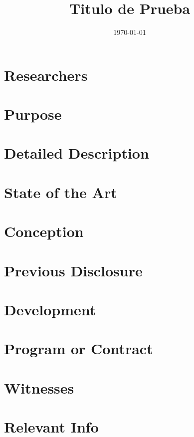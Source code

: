 \documentclass{article}
\title{
Titulo de Prueba
}
\date{\today}
\begin{document}
\maketitle

\section*{Researchers}

\section*{Purpose}

\section*{Detailed Description}

\section*{State of the Art}

\section*{Conception}

\section*{Previous Disclosure}

\section*{Development}

\section*{Program or Contract}

\section*{Witnesses}

\section*{Relevant Info}
\end{document}
